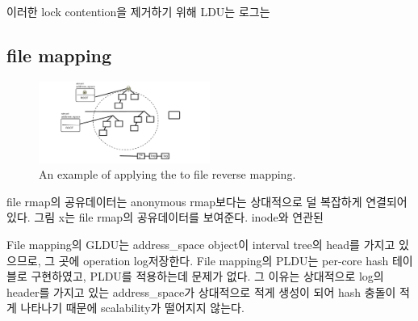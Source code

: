 
이러한 lock contention을 제거하기 위해 LDU는 로그는


\subsection{file mapping}

\begin{figure}[tb]
  \begin{center}
     \includegraphics[width=0.5\textwidth,height=0.5\textheight,keepaspectratio]{fig/file_rmap}
  \end{center}
  \caption{An example of applying the  to file reverse mapping. }
  \label{fig:deferu}
\end{figure}


file rmap의 공유데이터는 anonymous rmap보다는 상대적으로 덜 복잡하게 연결되어 있다.
그림 x는 file rmap의 공유데이터를 보여준다. 
inode와 연관된 


File mapping의 GLDU는 address\_space object이 interval tree의 head를 가지고 있으므로, 그 곳에
operation log저장한다. File mapping의 PLDU는 per-core hash 테이블로 구현하였고, PLDU를 적용하는데 문제가
없다.
그 이유는 상대적으로 log의 header를 가지고 있는 address\_space가 상대적으로 적게 생성이 되어 hash 충돌이 적게 나타나기
때문에 scalability가 떨어지지 않는다.






